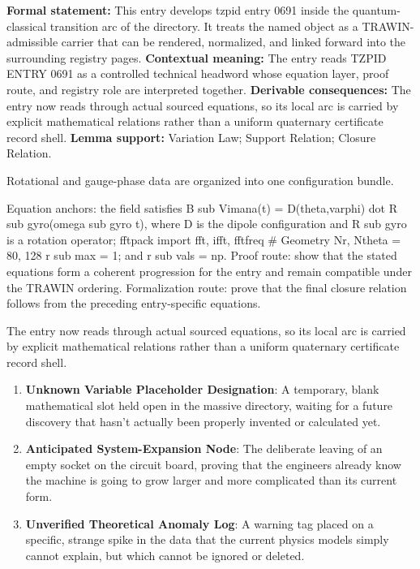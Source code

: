 \begingroup\footnotesize\setlength{\emergencystretch}{3em}\sloppy
\textbf{Formal statement:} This entry develops tzpid entry 0691 inside the quantum-classical transition arc of the directory. It treats the named object as a TRAWIN-admissible carrier that can be rendered, normalized, and linked forward into the surrounding registry pages. \textbf{Contextual meaning:} The entry reads TZPID ENTRY 0691 as a controlled technical headword whose equation layer, proof route, and registry role are interpreted together. \textbf{Derivable consequences:} The entry now reads through actual sourced equations, so its local arc is carried by explicit mathematical relations rather than a uniform quaternary certificate record shell. \textbf{Lemma support:} Variation Law; Support Relation; Closure Relation.\par
\endgroup

Rotational and gauge-phase data are organized into one configuration bundle.

Equation anchors: the field satisfies B sub Vimana(t) = D(theta,varphi) dot R sub gyro(omega sub gyro t), where D is the dipole configuration and R sub gyro is a rotation operator; fftpack import fft, ifft, fftfreq \# Geometry Nr, Ntheta = 80, 128 r sub max = 1; and r sub vals = np. Proof route: show that the stated equations form a coherent progression for the entry and remain compatible under the TRAWIN ordering. Formalization route: prove that the final closure relation follows from the preceding entry-specific equations.

The entry now reads through actual sourced equations, so its local arc is carried by explicit mathematical relations rather than a uniform quaternary certificate record shell.
\endgroup

\begin{enumerate}[leftmargin=1.6em,itemsep=6pt,topsep=4pt]
\item \textbf{Unknown Variable Placeholder Designation}: A temporary, blank mathematical slot held open in the massive directory, waiting for a future discovery that hasn't actually been properly invented or calculated yet.
\item \textbf{Anticipated System-Expansion Node}: The deliberate leaving of an empty socket on the circuit board, proving that the engineers already know the machine is going to grow larger and more complicated than its current form.
\item \textbf{Unverified Theoretical Anomaly Log}: A warning tag placed on a specific, strange spike in the data that the current physics models simply cannot explain, but which cannot be ignored or deleted.
\end{enumerate}

